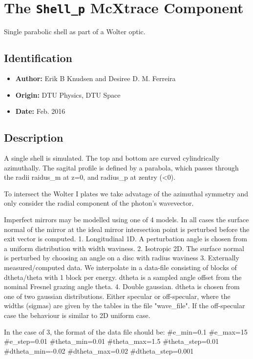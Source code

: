\section{The \texttt{Shell\_p} McXtrace Component}
Single parabolic shell as part of a Wolter optic.

\subsection*{Identification}
\begin{itemize}
  \item \textbf{Author:} Erik B Knudsen and Desiree D. M. Ferreira
  \item \textbf{Origin:} DTU Physics, DTU Space
  \item \textbf{Date:} Feb. 2016
\end{itemize}

\subsection*{Description}
A single shell is simulated. The top and bottom are curved cylindrically azimuthally. The sagital profile is defined by a parabola, which passes through the radii raidus\_m at z=0, and radius\_p at zentry (\textless{}0).

To intersect the Wolter I plates we take advatage of the azimuthal symmetry and only consider the radial component of the photon's wavevector.

Imperfect mirrors may be modelled using one of 4 models. In all cases the surface normal of the mirror at the ideal mirror intersection point is perturbed before the exit vector is computed. 1. Longitudinal 1D. A perturbation angle is chosen from a uniform distribution with width waviness. 2. Isotropic 2D. The surface normal is perturbed by choosing an angle on a disc with radius waviness 3. Externally measured/computed data. We interpolate in a data-file consisting of blocks of dtheta/theta with 1 block per energy. dtheta is a sampled angle offset from the nominal Fresnel grazing angle theta. 4. Double gaussian. dtheta is chosen from one of two gaussian distributions. Either specular or off-specular, where the widths (sigmas) are given by the tables in the file "wave\_file". If the off-specular case the behaviour is similar to 2D uniform case.

In the case of 3, the format of the data file should be: \#e\_min=0.1 \#e\_max=15 \#e\_step=0.01 \#theta\_min=0.01 \#theta\_max=1.5 \#theta\_step=0.01 \#dtheta\_min=-0.02 \#dtheta\_max=0.02 \#dtheta\_step=0.001

